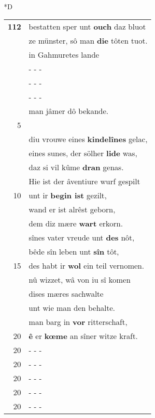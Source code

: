 \documentclass[8pt,a4paper,notitlepage]{article}
\begin{document}
\begin{table}[ht]
\begin{minipage}[t]{0.5\linewidth}
\small
\begin{center}*D
\end{center}
\begin{tabular}{rl}
\textbf{112} & bestatten sper unt \textbf{ouch} daz bluot\\ 
 & ze münster, sô man \textbf{die} tôten tuot.\\ 
 & in Gahmuretes lande\\ 
 & \multicolumn{1}{l}{ - - - }\\ 
 & \multicolumn{1}{l}{ - - - }\\ 
 & \multicolumn{1}{l}{ - - - }\\ 
 & man jâmer dô bekande.\\ 
5 & \textbf{\begin{large}D\end{large}annen} über den vierzehenden tac\\ 
 & diu vrouwe eines \textbf{kindelînes} gelac,\\ 
 & eines sunes, der sölher \textbf{lide} was,\\ 
 & daz si vil kûme \textbf{dran} genas.\\ 
 & Hie ist der âventiure wurf gespilt\\ 
10 & unt ir \textbf{begin ist} gezilt,\\ 
 & wand er ist alrêst geborn,\\ 
 & dem diz mære \textbf{wart} erkorn.\\ 
 & sînes vater vreude unt \textbf{des} nôt,\\ 
 & bêde sîn leben unt \textbf{sîn} tôt,\\ 
15 & des habt ir \textbf{wol} ein teil vernomen.\\ 
 & nû wizzet, wâ von iu sî komen\\ 
 & dises mæres sachwalte\\ 
 & unt wie man den behalte.\\ 
 & man barg in \textbf{vor} ritterschaft,\\ 
20 & \textbf{ê} er \textbf{kœme} an sîner witze kraft.\\ 
20 & \multicolumn{1}{l}{ - - - }\\ 
20 & \multicolumn{1}{l}{ - - - }\\ 
20 & \multicolumn{1}{l}{ - - - }\\ 
20 & \multicolumn{1}{l}{ - - - }\\ 
20 & \multicolumn{1}{l}{ - - - }\\ 

\end{tabular}
\end{minipage}
\end{table}
\end{document}
